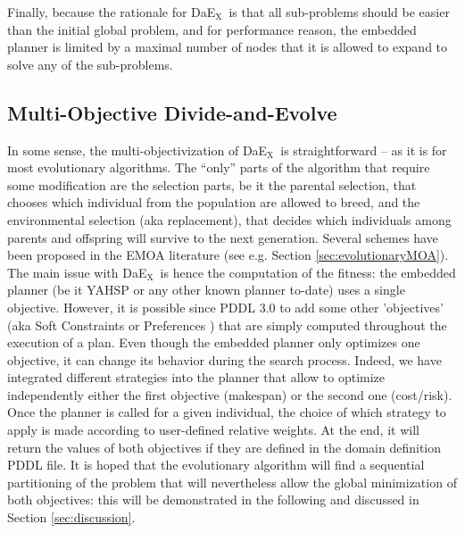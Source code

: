 \documentclass[a4paper,10pt]{article}
\def\DAEX{{\sc DaE$_{\text{X}}$}}
\begin{document}
Finally, because the rationale for \DAEX\ is that all sub-problems should be easier than the initial global problem, and for performance reason, the embedded planner is limited by a maximal number of nodes that it is allowed to expand to solve any of the sub-problems.
 
\subsection{Multi-Objective Divide-and-Evolve}
\label{modae}
In some sense, the multi-objectivization of \DAEX\ is straightforward -- as it is for most evolutionary algorithms. The ``only'' parts of the algorithm that
require some modification are the selection parts, be it the parental selection, that chooses which individual from the population are allowed to breed, 
and the environmental selection (aka replacement), that decides which individuals among parents and offspring will survive to the next generation.
Several schemes have been proposed in the EMOA literature (see e.g. Section \ref{sec:evolutionaryMOA}). 
The main issue with \DAEX\ is hence the computation of the fitness: the embedded planner (be it YAHSP or any other known planner to-date) uses a single objective. 
However, it is possible since PDDL 3.0 to add some other 'objectives' (aka Soft Constraints or Preferences \cite{gerevini2006preferences})
that are simply computed throughout the execution of a plan. 
Even though the embedded planner only optimizes one objective, it can change its behavior during the search process.
Indeed, we have integrated different strategies into the planner that allow to optimize independently either the first objective (makespan) or the second one (cost/risk).
Once the planner is called for a given individual, the choice of which strategy to apply is made according to user-defined relative weights. At the end, it will return the values of both objectives if they are defined in the domain definition PDDL file. 
It is hoped that the evolutionary algorithm will find a sequential partitioning of the problem that will nevertheless allow the global minimization of both objectives: 
 this will be demonstrated in the following and discussed in Section \ref{sec:discussion}.
\end{document}
